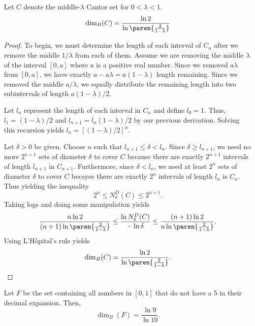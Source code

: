 \begin{example}
	Let $C$ denote the middle-$\lambda$ Cantor set for $0<\lambda < 1$.
	\[
		\dim_B(C)=\frac{\ln2}{\ln\paren{\frac{2}{1-\lambda}}}
	\]
\end{example}
\begin{proof}
	To begin, we must determine the length of each interval of $C_n$ after we remove the middle $1/\lambda$ from each of them.
	Assume we are removing the middle $\lambda$ of the interval $[0,a]$ where $a$ is a positive real number.
	Since we removed $a\lambda$ from $[0,a]$, we have exactly $a-a\lambda=a(1-\lambda)$ length remaining.
	Since we removed the middle $a/\lambda$, we equally distribute the remaining length into two subintervals of length $a(1-\lambda)/2$.
	
	Let $l_n$ represent the length of each interval in $C_n$ and define $l_0=1$.
	Thus, $l_1=(1-\lambda)/2$ and $l_{n+1}=l_n(1-\lambda)/2$ by our previous derivation.
	Solving this recursion yields $l_n=[(1-\lambda)/2]^n$.
	
	Let $\delta>0$ be given.
	Choose $n$ such that $l_{n+1}\leq\delta< l_n$.
	Since $\delta \geq l_{n+1}$, we need no more $2^{n+1}$ sets of diameter $\delta$ to cover $C$ because there are exactly $2^{n+1}$ intervals of length $l_{n+1}$ in $C_{n+1}$.
	Furthermore, since $\delta < l_n$, we need at least $2^n$ sets of diameter $\delta$ to cover $C$ becayse there are exactly $2^n$ intervals of length $l_n$ is $C_n$.
	Thus yielding the inequality
	\[
	2^n \leq N^D_\delta(C) \leq 2^{n+1}.
	\]
	Taking logs and doing some manipulation yields
	\[
		\frac{n\ln2}{(n+1)\ln \paren{\frac{2}{1-\lambda}}}\leq\frac{\ln N^D_\delta(C)}{-\ln\delta}\leq\frac{(n+1)\ln2}{n\ln \paren{\frac{2}{1-\lambda}}}.
	\]
	Using L'H\^{o}pital's rule yields
	\[
		\dim_B(C)=\frac{\ln2}{\ln\paren{\frac{2}{1-\lambda}}}.
	\]
\end{proof}

\begin{example}
	Let $F$ be the set containing all numbers in $[0,1]$ that do not have a 5 in their decimal expansion.
	Then,
	\[
		\dim_B(F)=\frac{\ln9}{\ln10}.
	\]
\end{example}

